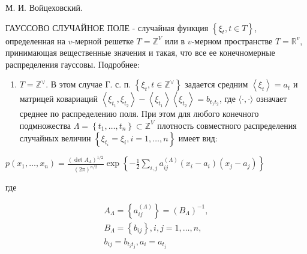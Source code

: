 \documentclass[10pt]{article}
\begin{document}
М. И. Войцеховский.



ГАУССОВО СЛУЧАЙНОЕ ПОЛЕ - случайная функция $\left\{\xi_{t}, t \in T\right\}$, определенная на $v$-мерной решетке $T=\mathbb{Z}^{V}$ или в $v$-мерном пространстве $T=\mathbb{R}^{v}$, принимающая вещественные значения и такая, что все ее конечномерные распределения гауссовы. Подробнее:



\begin{enumerate}

  \item $T=\mathbb{Z}^{\vee}$. В этом случае Г. с. п. $\left\{\xi_{t}, t \in \mathbb{Z}^{\vee}\right\}$ задается средним $\left\langle\xi_{t}\right\rangle=a_{t}$ и матрицей ковариаций $\left\langle\xi_{t_{1}}, \xi_{t_{2}}\right\rangle-\left\langle\xi_{t_{1}}\right\rangle\left\langle\xi_{t_{2}}\right\rangle=b_{t_{1} t_{2}}$, где $\langle\cdot, \cdot\rangle$ означает среднее по распределению поля. При этом для любого конечного подмножества $\Lambda=\left\{t_{1}, \ldots, t_{n}\right\} \subset \mathbb{Z}^{V}$ плотность совместного распределения случайных величин $\left\{\xi_{t_{i}}=\xi_{i}, i=1, \ldots, n\right\}$ имеет вид:

\end{enumerate}



$p\left(x_{1}, \ldots, x_{n}\right)=\frac{\left(\operatorname{det} A_{\Lambda}\right)^{1 / 2}}{(2 \pi)^{n / 2}} \exp \left\{-\frac{1}{2} \sum_{i, j} a_{i j}^{(\Lambda)}\left(x_{i}-a_{i}\right)\left(x_{j}-a_{j}\right)\right\}$



где



\[

\begin{gathered}

A_{\Lambda}=\left\{a_{i j}^{(\Lambda)}\right\}=\left(B_{\Lambda}\right)^{-1}, \\

B_{\Lambda}=\left\{b_{i j}\right\}, i, j=1, \ldots, n, \\

b_{i j}=b_{t_{i} t_{j}}, a_{i}=a_{t_{j}}

\end{gathered}

\]
\end{document}
